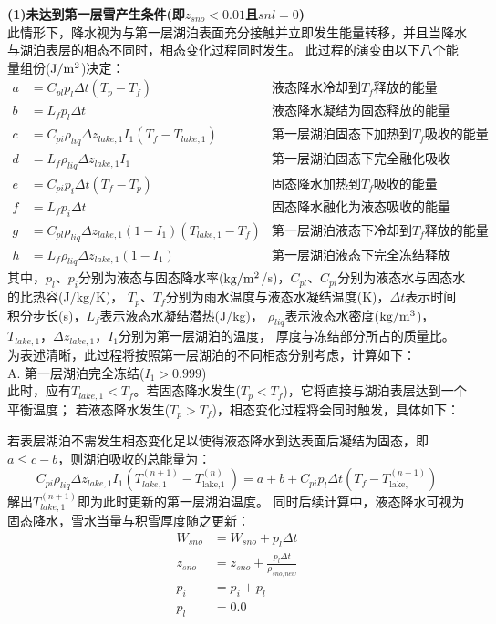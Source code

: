 \textbf {(1)未达到第一层雪产生条件(即$z_{sno}<0.01$且$snl=0$)}\\
此情形下，降水视为与第一层湖泊表面充分接触并立即发生能量转移，并且当降水与湖泊表层的相态不同时，相态变化过程同时发生。
此过程的演变由以下八个能量组份($\rm J/m^2$)决定：
\begin{align*}
a &= C_{pl} p_{l} \Delta t\left(T_{p}-T_{f}\right)   & \text{液态降水冷却到$T_f$释放的能量} \\
b &= L_f p_l \Delta t                                           & \text{液态降水凝结为固态释放的能量} \\
c &= C_{pi} \rho_{liq} \Delta z_{lake, 1} I_{1}\left(T_f-T_{lake, 1}\right)  & \text{第一层湖泊固态下加热到$T_f$吸收的能量} \\
d &= L_f \rho_{liq} \Delta z_{lake, 1} I_{1}         & \text{第一层湖泊固态下完全融化吸收的能量} \\
e &= C_{pi} p_i \Delta t\left(T_f -T_p\right)        & \text{固态降水加热到$T_f$吸收的能量} \\
f &= L_f p_i \Delta t                                           & \text{固态降水融化为液态吸收的能量} \\
g &= C_{pl} \rho_{liq} \Delta z_{lake, 1}\left(1-I_{1}\right)\left(T_{lake, 1}-T_f\right)  & \text{第一层湖泊液态下冷却到$T_f$释放的能量} \\
h &= L_f \rho_{liq} \Delta z_{lake, 1}\left(1-I_{1}\right)  & \text{第一层湖泊液态下完全冻结释放的能量}
\end{align*}
其中，$p_l$、$p_i$分别为液态与固态降水率($\rm kg/m^2$/s)，$C_{pl}$、$C_{pi}$分别为液态水与固态水的比热容(J/kg/K)，
$T_p$、$T_f$分别为雨水温度与液态水凝结温度(K)，$\Delta t$表示时间积分步长(s)，$L_f$表示液态水凝结潜热(J/kg)，
$\rho_{liq}$表示液态水密度($\rm kg/m^3$)，$T_{lake,1}$，$\Delta z_{lake,1}$，$I_1$分别为第一层湖泊的温度，
厚度与冻结部分所占的质量比。为表述清晰，此过程将按照第一层湖泊的不同相态分别考虑，计算如下：\\

A. 第一层湖泊完全冻结($I_1>0.999$)\\
此时，应有$T_{lake,1}<T_f$。若固态降水发生($T_p<T_f$)，它将直接与湖泊表层达到一个平衡温度；
若液态降水发生($T_p>T_f$)，相态变化过程将会同时触发，具体如下：

若表层湖泊不需发生相态变化足以使得液态降水到达表面后凝结为固态，即$a\le c-b$，则湖泊吸收的总能量为：
\begin{equation}
C_{pi} \rho_{liq} \Delta z_{lake,1} I_{1}\left(T_{lake, 1}^{(n+1)}-T_{\text {lake,1 }}^{(n)}\right)=a+b+C_{pi} p_{l} \Delta t\left(T_{f}-T_{\text {lake, }}^{(n+1)}\right)
\end{equation}
解出$T_{lake,1}^{\left(n+1\right)}$即为此时更新的第一层湖泊温度。
同时后续计算中，液态降水可视为固态降水，雪水当量与积雪厚度随之更新：
\begin{equation}
\begin{aligned}
W_{sno} &= W_{sno}+p_l \Delta t \\ 
z_{sno} &= z_{sno}+\frac{p_l \Delta t}{\rho_{sno,new}} \\ 
p_i &= p_i + p_l \\ 
p_l &= 0.0
\end{aligned}
\end{equation}


